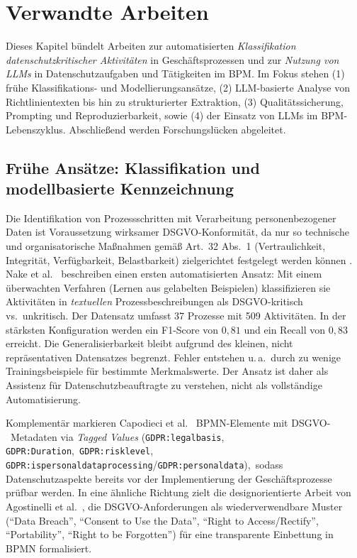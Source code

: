 \section{Verwandte Arbeiten}\label{sec:verwandte-arbeiten}

Dieses Kapitel bündelt Arbeiten zur automatisierten \emph{Klassifikation datenschutzkritischer Aktivitäten} in Geschäftsprozessen und zur \emph{Nutzung von \acp{LLM}} in Datenschutzaufgaben und Tätigkeiten im \ac{BPM}. Im Fokus stehen (1) frühe Klassifikations- und Modellierungsansätze, (2) \ac{LLM}-basierte Analyse von Richtlinientexten bis hin zu strukturierter Extraktion, (3) Qualitätssicherung, Prompting und Reproduzierbarkeit, sowie (4) der Einsatz von \acp{LLM} im \ac{BPM}-Lebenszyklus. Abschließend werden Forschungslücken abgeleitet.

\subsection*{Frühe Ansätze: Klassifikation und modellbasierte Kennzeichnung}

Die Identifikation von Prozessschritten mit Verarbeitung personenbezogener Daten ist Voraussetzung wirksamer \ac{DSGVO}-Konformität, da nur so technische und organisatorische Maßnahmen gemäß Art.~32 Abs.~1 (Vertraulichkeit, Integrität, Verfügbarkeit, Belastbarkeit) zielgerichtet festgelegt werden können \cite{GDPR2016}. Nake et al.\ \cite{nake2023towards} beschreiben einen ersten automatisierten Ansatz: Mit einem überwachten Verfahren (Lernen aus gelabelten Beispielen) klassifizieren sie Aktivitäten in \emph{textuellen} Prozessbeschreibungen als \ac{DSGVO}-kritisch vs.\ unkritisch. Der Datensatz umfasst 37 Prozesse mit 509 Aktivitäten. In der stärksten Konfiguration werden ein F1-Score von $0{,}81$ und ein Recall von $0{,}83$ erreicht. Die Generalisierbarkeit bleibt aufgrund des kleinen, nicht repräsentativen Datensatzes begrenzt. Fehler entstehen u.\,a.\ durch zu wenige Trainingsbeispiele für bestimmte Merkmalswerte. Der Ansatz ist daher als Assistenz für Datenschutzbeauftragte zu verstehen, nicht als vollständige Automatisierung.

Komplementär markieren Capodieci et al.\ \cite{Capodieci2023BPMNEnabledDP} \ac{BPMN}-Elemente mit \ac{DSGVO}-\linebreak~Metadaten via \emph{Tagged Values} (\texttt{GDPR:legalbasis}, \texttt{GDPR:Duration},\linebreak~\texttt{GDPR:risklevel}, \texttt{GDPR:ispersonaldataprocessing}/\texttt{GDPR:personaldata}),\linebreak~sodass Datenschutzaspekte bereits vor der Implementierung der Geschäftsprozesse prüfbar werden. In eine ähnliche Richtung zielt die designorientierte Arbeit von Agostinelli et al.\ \cite{agostinelli2019achievingGDPRComliance}, die \ac{DSGVO}-Anforderungen als wiederverwendbare Muster (\enquote{Data Breach}, \enquote{Consent to Use the Data}, \enquote{Right to Access/Rectify}, \enquote{Portability}, \enquote{Right to be Forgotten}) für eine transparente Einbettung in \ac{BPMN} formalisiert.

